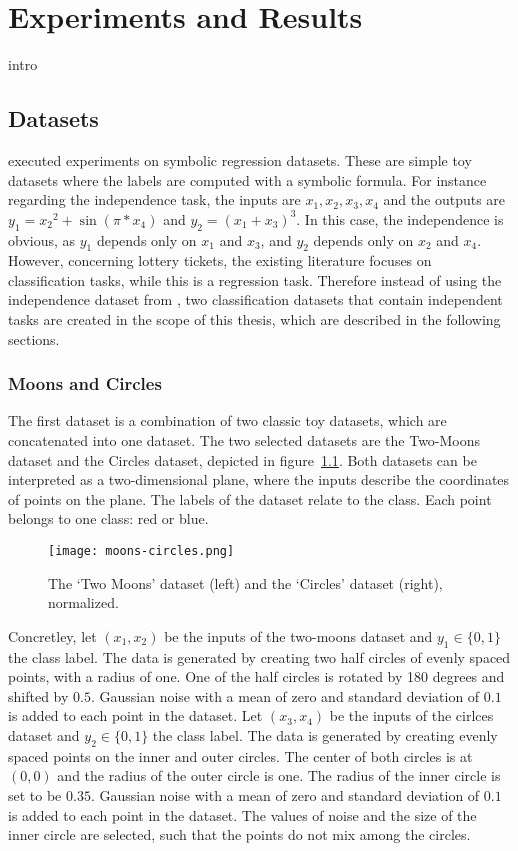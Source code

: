 \chapter{Experiments and Results}\label{chapter:experiments} 
intro

\section{Datasets}
\textcite{BIMT} executed experiments on symbolic regression datasets.
These are simple toy datasets where the labels are computed with a symbolic formula. 
For instance regarding the independence task, the inputs are $x_1, x_2, x_3, x_4$ and the outputs are $y_1={x_2}^2 + \sin{(\pi*x_4)}$ and $y_2={(x_1+x_3)}^3$.
In this case, the independence is obvious, as $y_1$ depends only on $x_1$ and $x_3$, and $y_2$ depends only on $x_2$ and $x_4$.
However, concerning lottery tickets, the existing literature focuses on classification tasks, while this is a regression task.
Therefore instead of using the independence dataset from \autocite{BIMT}, 
two classification datasets that contain independent tasks are created in the scope of this thesis, which are described in the following sections.

\subsection{Moons and Circles}\label{sec:independece_dataset}
The first dataset is a combination of two classic toy datasets, which are concatenated into one dataset.
The two selected datasets are the Two-Moons dataset and the Circles dataset, depicted in figure~\ref{fig:moons_circles}.
Both datasets can be interpreted as a two-dimensional plane, where the inputs describe the coordinates of points on the plane. 
The labels of the dataset relate to the class.
Each point belongs to one class: red or blue.

\begin{figure}[ht]
    \centering
    \texttt{[image: moons-circles.png]}
    \caption{
        The `Two Moons' dataset (left) and the `Circles' dataset (right), normalized. 
    }\label{fig:moons_circles}
\end{figure}

Concretley, let $( x_1 , x_2 )$ be the inputs of the two-moons dataset and $y_1 \in \{0,1\}$ the class label.
The data is generated by creating two half circles of evenly spaced points, with a radius of one.
One of the half circles is rotated by 180 degrees and shifted by $0.5$.
Gaussian noise with a mean of zero and standard deviation of $0.1$ is added to each point in the dataset.
Let $( x_3 , x_4 )$ be the inputs of the cirlces dataset and $y_2 \in \{0,1\}$ the class label.
The data is generated by creating evenly spaced points on the inner and outer circles. 
The center of both circles is at $(0,0)$ and the radius of the outer circle is one.
The radius of the inner circle is set to be $0.35$.
Gaussian noise with a mean of zero and standard deviation of $0.1$ is added to each point in the dataset.
The values of noise and the size of the inner circle are selected, such that the points do not mix among the circles.

